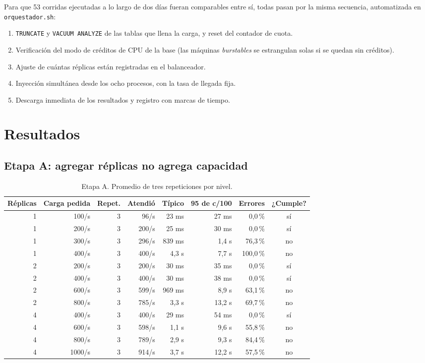 \documentclass[11pt]{article}
\begin{document}
Para que 53 corridas ejecutadas a lo largo de dos días fueran comparables entre sí, todas pasan por
la misma secuencia, automatizada en \texttt{orquestador.sh}:

\begin{enumerate}
  \item \texttt{TRUNCATE} y \texttt{VACUUM ANALYZE} de las tablas que llena la carga, y reset del contador de cuota.
  \item Verificación del modo de créditos de CPU de la base (las máquinas \textit{burstables} se estrangulan solas si se quedan sin créditos).
  \item Ajuste de cuántas réplicas están registradas en el balanceador.
  \item Inyección simultánea desde los ocho procesos, con la tasa de llegada fija.
  \item Descarga inmediata de los resultados y registro con marcas de tiempo.
\end{enumerate}


\section{Resultados}

\subsection{Etapa A: agregar réplicas no agrega capacidad}

\begin{table}[H]
\centering
\small
\begin{tabular}{r r r r r r r c}
\toprule
Réplicas & Carga pedida & Repet. & Atendió & Típico & 95 de c/100 & Errores & ¿Cumple? \\
\midrule
1 & 100/s & 3 & 96/s & 23 ms & 27 ms & 0,0\,\% & sí \\
1 & 200/s & 3 & 200/s & 25 ms & 30 ms & 0,0\,\% & sí \\
1 & 300/s & 3 & 296/s & 839 ms & 1,4 s & 76,3\,\% & no \\
1 & 400/s & 3 & 400/s & 4,3 s & 7,7 s & 100,0\,\% & no \\
2 & 200/s & 3 & 200/s & 30 ms & 35 ms & 0,0\,\% & sí \\
2 & 400/s & 3 & 400/s & 30 ms & 38 ms & 0,0\,\% & sí \\
2 & 600/s & 3 & 599/s & 969 ms & 8,9 s & 63,1\,\% & no \\
2 & 800/s & 3 & 785/s & 3,3 s & 13,2 s & 69,7\,\% & no \\
4 & 400/s & 3 & 400/s & 29 ms & 54 ms & 0,0\,\% & sí \\
4 & 600/s & 3 & 598/s & 1,1 s & 9,6 s & 55,8\,\% & no \\
4 & 800/s & 3 & 789/s & 2,9 s & 9,3 s & 84,4\,\% & no \\
4 & 1000/s & 3 & 914/s & 3,7 s & 12,2 s & 57,5\,\% & no \\
\bottomrule
\end{tabular}
\caption{Etapa A. Promedio de tres repeticiones por nivel.}
\end{table}
\end{document}
